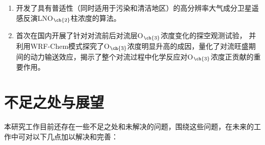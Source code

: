 \begin{enumerate}[label=（\arabic*）, labelindent=\parindent, nosep, leftmargin=0pt, widest=0, itemindent=*, topsep=0pt, partopsep=0pt, parsep=0pt]

\item 开发了具有普适性（同时适用于污染和清洁地区）的高分辨率大气成分卫星遥感反演LNO$_{\ch{2}}$柱浓度的算法。

\item 首次在国内开展了针对对流前后对流层O$_{\ch{3}}$浓度变化的探空观测试验，
并利用WRF-Chem模式探究了O$_{\ch{3}}$浓度明显升高的成因，量化了对流旺盛期间的动力输送效应，揭示了整个对流过程中化学反应对O$_{\ch{3}}$浓度正贡献的重要作用。





\end{enumerate}



\section{不足之处与展望}

本研究工作目前还存在一些不足之处和未解决的问题，围绕这些问题，在未来的工作中可对以下几点加以解决和完善：

